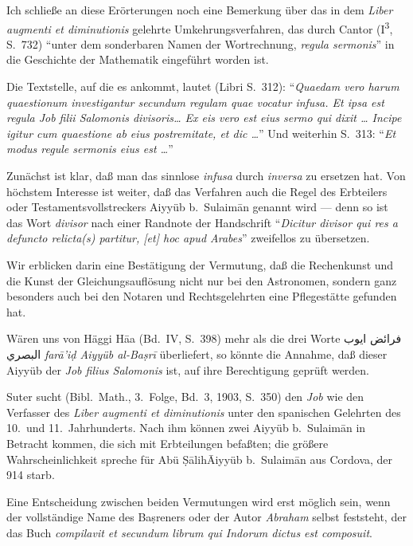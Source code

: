 \documentclass[11pt,a4paper]{article}
\newcommand{\RL}[1]{\beginR#1\endR}
\newcommand{\un}[1]{\=#1}
\newcommand{\alf}{\=a}
\newcommand{\ar}[1]{{\arabicfont\RL{#1}}}
\newcommand{\enquote}[1]{``#1''}
\begin{document}
Ich schlie\ss{}e an diese Er\"orterungen noch eine Bemerkung \"uber das in dem \textit{Liber augmenti et diminutionis} gelehrte Umkehrungsverfahren, das durch Cantor (I\textsuperscript{3}, S.\ 732) \enquote{unter dem sonderbaren Namen der Wortrechnung, \textit{regula sermonis}} in die Geschichte der Mathematik eingef\"uhrt worden ist.

Die Textstelle, auf die es ankommt, lautet (Libri S.\ 312): \enquote{\textit{Quaedam vero harum quaestionum investigantur secundum regulam quae vocatur infusa. Et ipsa est regula Job filii Salomonis divisoris\ldots{} Ex eis vero est eius sermo qui dixit \ldots{} Incipe igitur cum quaestione ab eius postremitate, et dic \ldots{}}} Und weiterhin S.\ 313: \enquote{\textit{Et modus regule sermonis eius est \ldots{}}}

Zun\"achst ist klar, da\ss{} man das sinnlose \textit{infusa} durch \textit{inversa} zu ersetzen hat. Von h\"ochstem Interesse ist weiter, da\ss{} das Verfahren auch die Regel des Erbteilers oder Testamentsvollstreckers Aiyy\"ub b.\ Sulaim\=an genannt wird --- denn so ist das Wort \textit{divisor} nach einer Randnote der Handschrift \enquote{\textit{Dicitur divisor qui res a defuncto relicta(s) partitur, [et] hoc apud Arabes}} zweifellos zu \"ubersetzen.

Wir erblicken darin eine Best\"atigung der Vermutung, da\ss{} die Rechenkunst und die Kunst der Gleichungsaufl\"osung nicht nur bei den Astronomen, sondern ganz besonders auch bei den Notaren und Rechtsgelehrten eine Pflegest\"atte gefunden hat.

W\"aren uns von H\"aggi H\alf{a} (Bd.\ IV, S.\ 398) mehr als die drei Worte \ar{فرائض ايوب البصري} \textit{far\=a'i\d{d} Aiyy\"ub al-Ba\d{s}r\=i} \"uberliefert, so k\"onnte die Annahme, da\ss{} dieser Aiyy\"ub der \textit{Job filius Salomonis} ist, auf ihre Berechtigung gepr\"uft werden.

Suter sucht (Bibl.\ Math., 3.\ Folge, Bd.\ 3, 1903, S.\ 350) den \textit{Job} wie den Verfasser des \textit{Liber augmenti et diminutionis} unter den spanischen Gelehrten des 10.\ und 11.\ Jahrhunderts. Nach ihm k\"onnen zwei Aiyy\"ub b.\ Sulaim\=an in Betracht kommen, die sich mit Erbteilungen befa\ss{}ten; die gr\"o\ss{}ere Wahrscheinlichkeit spreche f\"ur Ab\"u \d{S}\=alih\un{} Aiyy\"ub b.\ Sulaim\=an aus Cordova, der 914 starb.

Eine Entscheidung zwischen beiden Vermutungen wird erst m\"oglich sein, wenn der vollst\"andige Name des Ba\d{s}reners oder der Autor \textit{Abraham} selbst feststeht, der das Buch \textit{compilavit et secundum librum qui Indorum dictus est composuit}.
\end{document}
